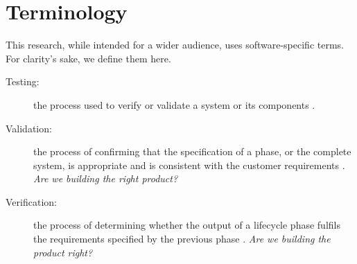 \chapter{Terminology}
This research, while intended for a wider audience, uses software-specific
terms. For clarity's sake, we define them here.

\begin{description}

\item[Testing:] the process used to verify or validate a system or its 
components \cite{Storey95}.

\item[Validation:] the process of confirming that the specification of a phase,
or the complete system, is appropriate and is consistent with the customer
requirements \cite{Storey95}. \textit{Are we building the right product?}

\item[Verification:] the process of determining whether the output of a
lifecycle phase fulfils the requirements specified by the previous phase
\cite{Storey95}. \textit{Are we building the product right?}


\end{description}
